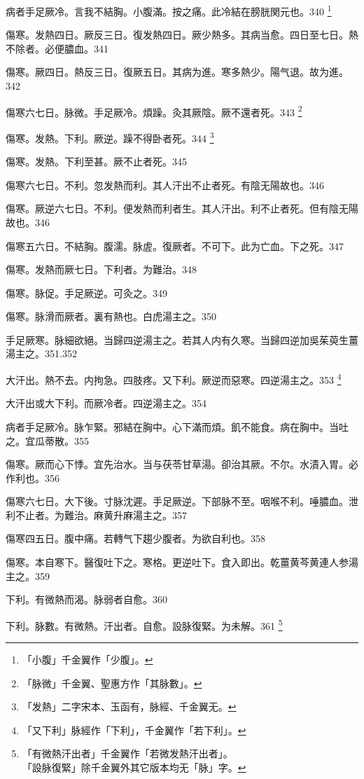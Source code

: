 病者手足厥冷。言我不結胸。小腹滿。按之痛。此冷結在膀胱関元也。340
	\footnote{「小腹」千金翼作「少腹」。}

傷寒。发熱四日。厥反三日。復{\khaaitp 发}熱四日。厥少熱多。其病当愈。四日至七日。熱不除者。必便膿血。341

傷寒。厥四日。熱反三日。復厥五日。其病为進。寒多熱少。陽气退。故为進。342

傷寒六七日。脉微。手足厥{\khaaitp 冷}。煩躁。灸其厥陰。厥不還者死。343
	\footnote{「脉微」千金翼、聖惠方作「其脉數」。}

傷寒。{\khaaitp 发熱。}下利。厥逆。躁不得卧者死。344
	\footnote{「发熱」二字宋本、玉函有，脉經、千金翼无。}

傷寒。发熱。下利至{\khaaitp 甚。}厥不止者死。345

傷寒六七日。不利。忽发熱而利。其人汗出不止者死。有陰无陽故也。346

傷寒。厥逆六七日。不利。便发熱而利者生。其人汗出。利不止者死。但有陰无陽故也。{\maijing}346

傷寒五六日。不結胸。腹濡。脉虗。復厥者。不可下。此为亡血。{\khaaitp 下之}死。347

傷寒。发熱而厥七日。下利者。为難治。348

傷寒。脉促。手足厥逆。可灸之。349

傷寒。脉滑而厥者。裏有熱也。白虎湯主之。350

手足厥寒。脉細欲絕。当歸四逆湯主之。若其人内有久寒。当歸四逆加吳茱萸生薑湯主之。351.352

大汗出。熱不去。内拘急。四肢疼。{\khaaitp 又}下利。厥逆而惡寒。四逆湯主之。353
	\footnote{「又下利」脉經作「下利」，千金翼作「若下利」。}

大汗{\khaaitp 出}或大下利。而厥冷者。四逆湯主之。354

病者手足厥冷。脉乍緊。邪結在胸中。心下滿而煩。飢不能食。病在胸中。当吐之。宜瓜蒂散。355

傷寒。厥而心下悸。宜先治水。当与茯苓甘草湯。卻治其厥。不尔。水漬入胃。必作利也。356

傷寒六七日。大下後。{\khaaitp 寸}脉沈遲。手足厥逆。下部脉不至。咽喉不利。唾膿血。泄利不止者。为難治。麻黄升麻湯主之。357

傷寒四五日。腹中痛。若轉气下趨少腹者。为欲自利也。358

傷寒。本自寒下。醫復吐{\khaaitp 下}之。寒格。更逆吐{\khaaitp 下}。食入即出。乾薑黄芩黄連人参湯主之。359

下利。有微熱而渴。脉弱者自愈。360

下利。脉數。有微熱。汗出者。自愈。設{\khaaitp 脉}復緊。为未解。361
	\footnote{「有微熱汗出者」千金翼作「若微发熱汗出者」。\\「設脉復緊」除千金翼外其它版本均无「脉」字。}

